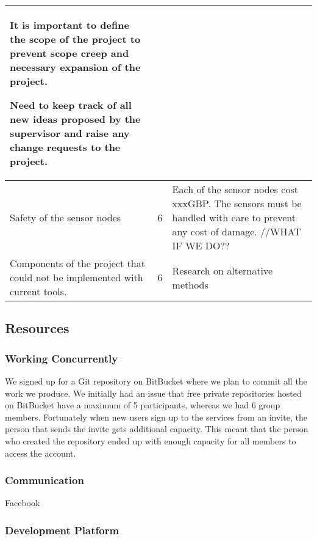 \begin{center}
\begin{longtable}{| p{5cm} | l | p{8cm} |}
It is important to define the scope of the project to prevent scope creep and necessary expansion of the project.

Need to keep track of all new ideas proposed by the supervisor and raise any change requests to the project.

		\\ \hline
		
	Safety of the sensor nodes
	& 6 & Each of the sensor nodes cost xxxGBP. The sensors must be handled with care to prevent any cost of damage. //WHAT IF WE DO??
		\\ \hline
		
	Components of the project that could not be implemented with current tools.
	& 6 & Research on alternative methods
	\\ \hline		
		
	\end{longtable}

\end{center}

\subsection{Resources}

\subsubsection{Working Concurrently}

We signed up for a Git repository on BitBucket \cite{bitbucket} where we plan to commit all the work we produce. We initially had an issue that free private repositories hosted on BitBucket have a maximum of 5 participants, whereas we had 6 group members. Fortunately when new users sign up to the services from an invite, the person that sends the invite gets additional capacity. This meant that the person who created the repository ended up with enough capacity for all members to access the account.

\subsubsection{Communication}

Facebook

\subsubsection{Development Platform}

